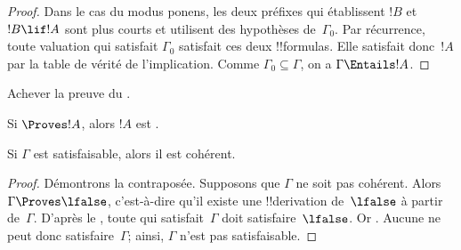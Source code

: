 \documentclass[../../../include/open-logic-section]{subfiles}
\begin{document}
\begin{proof}
{Dans le cas du modus ponens, les deux préfixes qui établissent
$!B$ et $!B \lif !A$ sont plus courts et utilisent des hypothèses
de~$\Gamma_0$. Par récurrence, toute valuation qui satisfait
$\Gamma_0$ satisfait ces deux !!{formula}s. Elle satisfait
donc~$!A$ par la table de vérité de l'implication. Comme
$\Gamma_0\subseteq\Gamma$, on a $\Gamma \Entails !A$.}
\end{proof}

\begin{prob}
Achever la preuve du .
\end{prob}
\tagendprob

\begin{cor}
Si $\Proves !A$, alors $!A$ est
.
\end{cor}

\begin{cor}
Si $\Gamma$ est satisfaisable, alors il est cohérent.
\end{cor}

\begin{proof}
Démontrons la contraposée. Supposons que $\Gamma$ ne soit pas
cohérent. Alors $\Gamma \Proves \lfalse$, c'est-à-dire qu'il existe
une !!{derivation} de~$\lfalse$ à partir de~$\Gamma$. D'après
le , toute
qui satisfait~$\Gamma$ doit satisfaire~$\lfalse$. Or
. Aucune
 ne peut
donc satisfaire~$\Gamma$; ainsi, $\Gamma$ n'est pas satisfaisable.
\end{proof}
\end{document}
